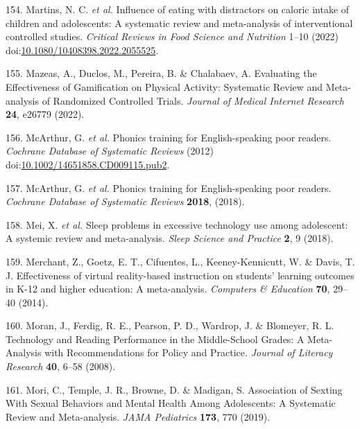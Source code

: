 \documentclass[
  english,
  man]{apa6}
\newenvironment{cslreferences}%
  {}%
  {\par}
\begin{document}
\begin{cslreferences}
\leavevmode\hypertarget{ref-martinsInfluenceEatingDistractors2022}{}%
154. Martins, N. C. \emph{et al.} Influence of eating with distractors on caloric intake of children and adolescents: A systematic review and meta-analysis of interventional controlled studies. \emph{Critical Reviews in Food Science and Nutrition} 1--10 (2022) doi:\href{https://doi.org/10.1080/10408398.2022.2055525}{10.1080/10408398.2022.2055525}.

\leavevmode\hypertarget{ref-mazeasEvaluatingEffectivenessGamification2022}{}%
155. Mazeas, A., Duclos, M., Pereira, B. \& Chalabaev, A. Evaluating the Effectiveness of Gamification on Physical Activity: Systematic Review and Meta-analysis of Randomized Controlled Trials. \emph{Journal of Medical Internet Research} \textbf{24}, e26779 (2022).

\leavevmode\hypertarget{ref-mcarthurPhonicsTrainingEnglishspeaking2012}{}%
156. McArthur, G. \emph{et al.} Phonics training for English-speaking poor readers. \emph{Cochrane Database of Systematic Reviews} (2012) doi:\href{https://doi.org/10.1002/14651858.CD009115.pub2}{10.1002/14651858.CD009115.pub2}.

\leavevmode\hypertarget{ref-mcarthurPhonicsTrainingEnglishspeaking2018}{}%
157. McArthur, G. \emph{et al.} Phonics training for English-speaking poor readers. \emph{Cochrane Database of Systematic Reviews} \textbf{2018}, (2018).

\leavevmode\hypertarget{ref-meiSleepProblemsExcessive2018}{}%
158. Mei, X. \emph{et al.} Sleep problems in excessive technology use among adolescent: A systemic review and meta-analysis. \emph{Sleep Science and Practice} \textbf{2}, 9 (2018).

\leavevmode\hypertarget{ref-merchantEffectivenessVirtualRealitybased2014}{}%
159. Merchant, Z., Goetz, E. T., Cifuentes, L., Keeney-Kennicutt, W. \& Davis, T. J. Effectiveness of virtual reality-based instruction on students' learning outcomes in K-12 and higher education: A meta-analysis. \emph{Computers \& Education} \textbf{70}, 29--40 (2014).

\leavevmode\hypertarget{ref-moranTechnologyReadingPerformance2008}{}%
160. Moran, J., Ferdig, R. E., Pearson, P. D., Wardrop, J. \& Blomeyer, R. L. Technology and Reading Performance in the Middle-School Grades: A Meta-Analysis with Recommendations for Policy and Practice. \emph{Journal of Literacy Research} \textbf{40}, 6--58 (2008).

\leavevmode\hypertarget{ref-moriAssociationSextingSexual2019}{}%
161. Mori, C., Temple, J. R., Browne, D. \& Madigan, S. Association of Sexting With Sexual Behaviors and Mental Health Among Adolescents: A Systematic Review and Meta-analysis. \emph{JAMA Pediatrics} \textbf{173}, 770 (2019).


\end{cslreferences}
\end{document}
